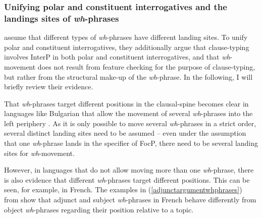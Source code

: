 \subsubsection{Unifying polar and constituent interrogatives and the landings sites of \textit{wh}-phrases}
\citet{aboh2010sa} assume that different types of \textit{wh}-phrases have different landing sites. To unify polar and constituent interrogatives, they additionally argue that clause-typing involves InterP in both polar and constituent interrogatives, and that \textit{wh}-movement does not result from feature checking for the purpose of clause-typing, but rather from the structural make-up of the \textit{wh}-phrase. In the following, I will briefly review their evidence.

That \textit{wh}-phrases target different positions in the clausal-spine becomes clear in languages like Bulgarian that allow the movement of several \textit{wh}-phrases into the left periphery \citep{rudin1988multiple}. As it is only possible to move several \textit{wh}-phrases in a strict order, several distinct landing sites need to be assumed -- even under the assumption that one \textit{wh}-phrase lands in the specifier of FocP, there need to be several landing sites for \textit{wh}-movement. 

However, in languages that do not allow moving more than one \textit{wh}-phrase, there is also evidence that different \textit{wh}-phrases target different positions. This can be seen, for example, in French. The examples in (\ref{adjunctargumentwhphrases}) from \citet[101]{aboh2010sa} show that adjunct and subject \textit{wh}-phrases in French behave differently from object \textit{wh}-phrases regarding their position relative to a topic.

